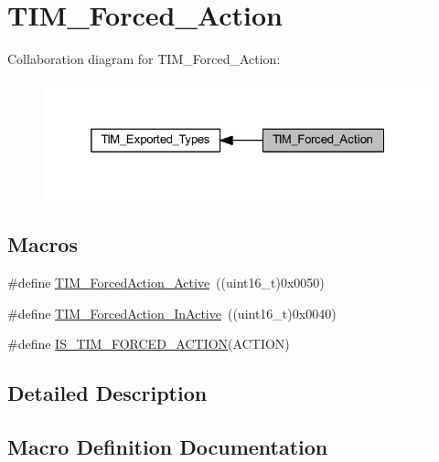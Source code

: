 \hypertarget{group___t_i_m___forced___action}{}\section{T\+I\+M\+\_\+\+Forced\+\_\+\+Action}
\label{group___t_i_m___forced___action}
Collaboration diagram for T\+I\+M\+\_\+\+Forced\+\_\+\+Action\+:
\nopagebreak
\begin{figure}[H]
\begin{center}
\leavevmode
\includegraphics[width=325pt]{group___t_i_m___forced___action}
\end{center}
\end{figure}
\subsection*{Macros}
\begin{DoxyCompactItemize}
\item 
\#define \hyperlink{group___t_i_m___forced___action_ga19d3769825f1dfdbdbde3edb60310b99}{T\+I\+M\+\_\+\+Forced\+Action\+\_\+\+Active}~((uint16\+\_\+t)0x0050)
\item 
\#define \hyperlink{group___t_i_m___forced___action_ga79656f2193ec5e12a15d0ae5b025d273}{T\+I\+M\+\_\+\+Forced\+Action\+\_\+\+In\+Active}~((uint16\+\_\+t)0x0040)
\item 
\#define \hyperlink{group___t_i_m___forced___action_gaa2cb16f281d32c95ab974dc5157bfa63}{I\+S\+\_\+\+T\+I\+M\+\_\+\+F\+O\+R\+C\+E\+D\+\_\+\+A\+C\+T\+I\+ON}(A\+C\+T\+I\+ON)
\end{DoxyCompactItemize}


\subsection{Detailed Description}


\subsection{Macro Definition Documentation}
\mbox{\label{group___t_i_m___forced___action_gaa2cb16f281d32c95ab974dc5157bfa63}} 
